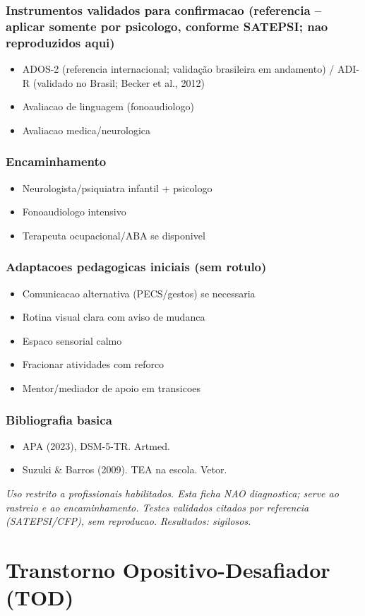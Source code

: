 \documentclass[a4paper,11pt]{book}
\newcommand{\avisolegal}{\par\medskip\noindent\footnotesize\itshape
\color{cinza}Uso restrito a profissionais habilitados. Esta ficha NAO diagnostica;
serve ao rastreio e ao encaminhamento. Testes validados citados por referencia
(SATEPSI/CFP), sem reproducao. Resultados: sigilosos.\color{black}\par}
\begin{document}
\subsection*{Instrumentos validados para confirmacao (referencia -- aplicar somente por psicologo, conforme SATEPSI; nao reproduzidos aqui)}
\begin{itemize}
\item ADOS-2 (referencia internacional; validação brasileira em andamento) / ADI-R (validado no Brasil; Becker et al., 2012)
\item Avaliacao de linguagem (fonoaudiologo)
\item Avaliacao medica/neurologica
\end{itemize}
\subsection*{Encaminhamento}
\begin{itemize}
\item Neurologista/psiquiatra infantil + psicologo
\item Fonoaudiologo intensivo
\item Terapeuta ocupacional/ABA se disponivel
\end{itemize}
\subsection*{Adaptacoes pedagogicas iniciais (sem rotulo)}
\begin{itemize}
\item Comunicacao alternativa (PECS/gestos) se necessaria
\item Rotina visual clara com aviso de mudanca
\item Espaco sensorial calmo
\item Fracionar atividades com reforco
\item Mentor/mediador de apoio em transicoes
\end{itemize}
\subsection*{Bibliografia basica}
\begin{itemize}
\item APA (2023), DSM-5-TR. Artmed.
\item Suzuki \& Barros (2009). TEA na escola. Vetor.
\end{itemize}
\avisolegal


\chapter{Transtorno Opositivo-Desafiador (TOD)}
\end{document}
